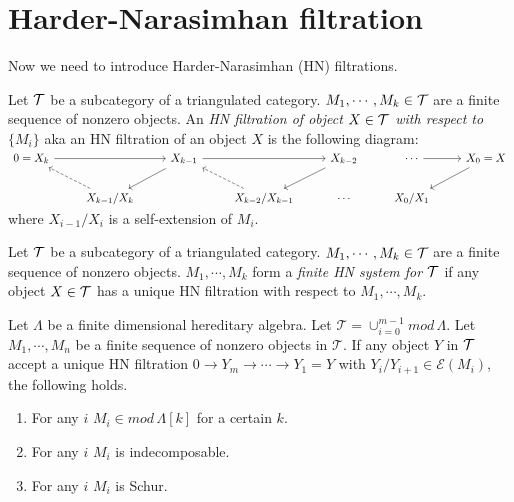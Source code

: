 \section{Harder-Narasimhan filtration}
\indent Now we need to introduce Harder-Narasimhan (HN) filtrations.\\
\begin{definition}
Let $\mathcal{T}$ be a subcategory of a triangulated category. $M_1,\cdots, M_k\in \mathcal{T}$ are a finite sequence of nonzero objects.  An \textit{HN filtration of object $X\in\mathcal{T}$ with respect to $\{M_i\}$} aka an HN filtration of an object $X$ is the following diagram:\\
$\begin{tikzcd}
0 = X_k\arrow[rr] &                               & X_{k-1}\arrow[ld]\arrow[rr]&                & X_{k-2}\arrow[ld]& \cdots & X_0 = X\arrow[ld]\arrow[l,leftarrow]\\
                            & X_{k-1}/X_k\arrow[lu, dashrightarrow] &        & X_{k-2}/X_{k-1}\arrow[lu, dashrightarrow] & \cdots & X_0/X_1&
\end{tikzcd}$
where $X_{i-1}/X_i$ is a self-extension of $M_i$. 
\end{definition}
\begin{definition}
Let $\mathcal{T}$ be a subcategory of a triangulated category. $M_1,\cdots, M_k\in \mathcal{T}$ are a finite sequence of nonzero objects. $M_1,\cdots, M_k$ form a \textit{finite HN system for $\mathcal{T}$} if any object $X\in\mathcal{T}$ has a unique HN filtration with respect to $M_1,\cdots, M_k$.
\end{definition}
\begin{lemma}\label{lem:C3L3}
Let $\Lambda$ be a finite dimensional hereditary algebra. Let $\mathcal{T} = \cup_{i=0}^{m-1} mod\,\Lambda$. Let $M_1,\cdots, M_n$ be a finite sequence of nonzero objects in $\mathcal{T}$. If any object $Y$ in $\mathcal{T}$ accept a unique HN filtration $0\to Y_m\to\cdots\to Y_1=Y$ with $Y_i/Y_{i+1}\in \mathcal{E}(M_i)$, the following holds.
\begin{enumerate}
\item For any $i$ $M_i\in mod\, \Lambda[k]$ for a certain $k$.
\item For any $i$ $M_i$ is indecomposable.
\item For any $i$ $M_i$ is Schur.
\end{enumerate}
\end{lemma}
